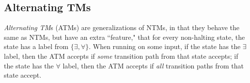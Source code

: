 




\subsection{Alternating TMs}
\begin{definition}
\emph{Alternating TM}s (ATMs) are generalizations of NTMs, in that they behave the same as NTMs, but have an extra ``feature," that for every non-halting state, the state has a label from $\{\exists, \forall\}$. When running on some input, if the state has the $\exists$ label, then the ATM accepts if \emph{some} transition path from that state accepts; if the state has the $\forall$ label, then the ATM accepts if \emph{all} transition paths from that state accept.
\end{definition}

